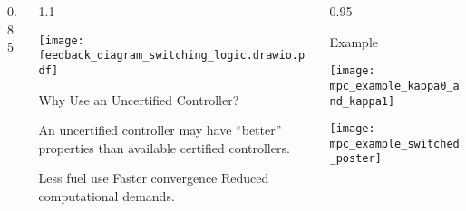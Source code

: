 \documentclass[final]{beamer}
\newlength{\sepwid}
\newlength{\onecolwid}
\begin{document}
\begin{frame}[t]
\begin{columns}[t]
\begin{column}{0.85\onecolwid}
\end{column} %
\hspace{\sepwid}
\begin{column}{1.1\onecolwid} %
    \vfill
    \begin{center}
        \hspace{-12pt} %
        \texttt{[image: feedback\_diagram\_switching\_logic.drawio.pdf]}
    \end{center}
    \vfill

        \begin{block}{Why Use an Uncertified Controller?}
    
            An uncertified controller may have ``better'' properties than available certified controllers.%
            \begin{itemize}
                \myitem Less fuel use
                \myitem Faster convergence 
                \myitem Reduced computational demands.
            \end{itemize}
    
        \end{block}

\end{column} %
\hspace{\sepwid}
\begin{column}{0.95\onecolwid} %
    
    \newcommand{\fsampled}{{f_{s}}}%
    \newcommand{\zsampled}{{z_{s}}}%
    \newcommand{\usampled}{{u_{s}}}%
    \newcommand{\Tsample}{{T}}%
    \newcommand{\Tactual}{{T_{c}}}%
    \begin{block}{Example}
    
        \begin{center}
            \texttt{[image: mpc\_example\_kappa0\_and\_kappa1]}
        \end{center}      
        \hspace{20pt}
        \texttt{[image: mpc\_example\_switched\_poster]}
    
    \end{block}
\end{column}
\end{columns} %

\end{frame} %
\end{document}
